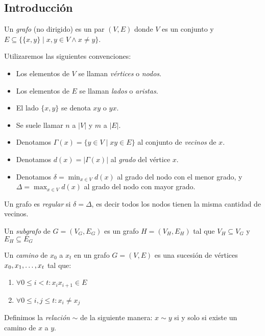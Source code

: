 \subsection{Introducción}

\begin{definition}
  Un \emph{grafo} (no dirigido) es un par $(V, E)$ donde $V$ es un conjunto y
  $E \subseteq \{\{x,y\} \mid x,y \in V \wedge x \neq y \}$.
\end{definition}

\begin{notation} Utilizaremos las siguientes convenciones:
  \begin{itemize}
  \item[] Los elementos de $V$ se llaman \emph{vértices} o \emph{nodos}.

  \item[] Los elementos de $E$ se llaman \emph{lados} o \emph{aristas}.

  \item[] El lado $\{x,y\}$ se denota $xy$ o $yx$.

  \item[] Se suele llamar $n$ a $|V|$ y $m$ a $|E|$.

  \item[] Denotamos $\Gamma(x) = \{y \in V \mid xy \in E \}$ al conjunto de
    \emph{vecinos} de $x$.

  \item[] Denotamos $d(x) = |\Gamma(x)|$ al \emph{grado} del vértice $x$.

  \item[] Denotamos $\delta = \min_{x \in V} d(x)$ al grado del nodo con el menor
    grado, y $\Delta = \max_{x \in V} d(x)$ al grado del nodo con mayor grado.
  \end{itemize}
\end{notation}

\begin{definition}
  Un grafo es \emph{regular} si $\delta = \Delta$, es decir todos los nodos
  tienen la misma cantidad de vecinos.
\end{definition}

\begin{definition}
  Un \emph{subgrafo} de $G = (V_G,E_G)$ es un grafo $H = (V_H,E_H)$ tal que 
  $V_H \subseteq V_G$ y $E_H \subseteq E_G$
\end{definition}

\begin{definition}
  Un \emph{camino} de $x_0$ a $x_t$ en un grafo $G = (V,E)$ es una sucesión de
  vértices $x_0, x_1, \mathellipsis, x_t$ tal que:
\begin{enumerate}
    \item $\forall 0 \le i < t \colon x_i x_{i+1} \in E$
    \item $\forall 0 \le i, j \le t \colon x_i \neq x_j$
\end{enumerate}
Definimos la \emph{relación} $\sim$ de la siguiente manera: $x \sim y$ si y
solo si existe un camino de $x$ a $y$.
\end{definition}

